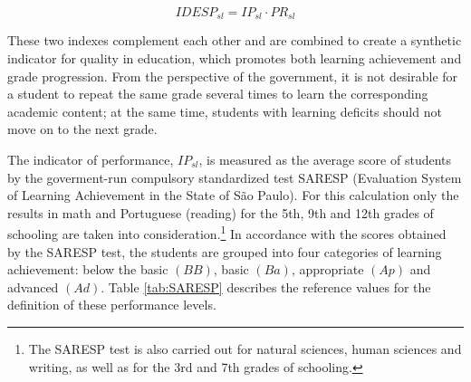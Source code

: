 \documentclass[a4paper, 12pt]{article}
\begin{document}
\begin{equation} \label{eq:IDESP}
IDESP_{sl} = IP_{sl} \cdot PR_{sl}
\end{equation}

These two indexes complement each other and are combined to create a synthetic indicator for quality in education, which promotes both learning achievement and grade progression. From the perspective of the government, it is not desirable for a student to repeat the same grade several times to learn the corresponding academic content; at the same time, students with learning deficits should not move on to the next grade.

The indicator of performance, $IP_{sl}$, is measured as the average score of students by the goverment-run compulsory standardized test SARESP (Evaluation System of Learning Achievement in the State of São Paulo). For this calculation only the results in math and Portuguese (reading) for the 5th, 9th and 12th grades of schooling are taken into consideration.\footnote{The SARESP test is also carried out for natural sciences, human sciences and writing, as well as for the 3rd and 7th grades of schooling.} In accordance with the scores obtained by the SARESP test, the students are grouped into four categories of learning achievement: below the basic $(BB)$, basic $(Ba)$, appropriate $(Ap)$ and advanced $(Ad)$. Table \ref{tab:SARESP} describes the reference values for the definition of these performance levels.
\end{document}
